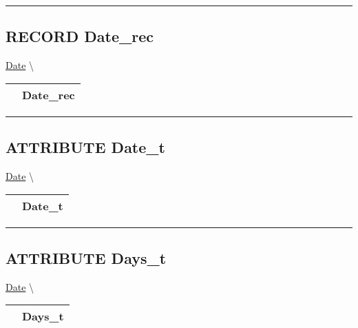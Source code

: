 \rule{\linewidth}{0.5pt}

\subsection*{\textsf{\colorbox{headtoc}{\color{white} RECORD}
Date\_rec}}

\hypertarget{ecldoc:date.date_rec}{}
\hspace{0pt} \hyperlink{ecldoc:Date}{Date} \textbackslash 

{\renewcommand{\arraystretch}{1.5}
\begin{tabularx}{\textwidth}{|>{\raggedright\arraybackslash}l|X|}
\hline
\hspace{0pt}\mytexttt{\color{red} } & \textbf{Date\_rec} \\
\hline
\end{tabularx}
}

\par


\rule{\linewidth}{0.5pt}
\subsection*{\textsf{\colorbox{headtoc}{\color{white} ATTRIBUTE}
Date\_t}}

\hypertarget{ecldoc:date.date_t}{}
\hspace{0pt} \hyperlink{ecldoc:Date}{Date} \textbackslash 

{\renewcommand{\arraystretch}{1.5}
\begin{tabularx}{\textwidth}{|>{\raggedright\arraybackslash}l|X|}
\hline
\hspace{0pt}\mytexttt{\color{red} } & \textbf{Date\_t} \\
\hline
\end{tabularx}
}

\par


\rule{\linewidth}{0.5pt}
\subsection*{\textsf{\colorbox{headtoc}{\color{white} ATTRIBUTE}
Days\_t}}

\hypertarget{ecldoc:date.days_t}{}
\hspace{0pt} \hyperlink{ecldoc:Date}{Date} \textbackslash 

{\renewcommand{\arraystretch}{1.5}
\begin{tabularx}{\textwidth}{|>{\raggedright\arraybackslash}l|X|}
\hline
\hspace{0pt}\mytexttt{\color{red} } & \textbf{Days\_t} \\
\hline
\end{tabularx}
}


